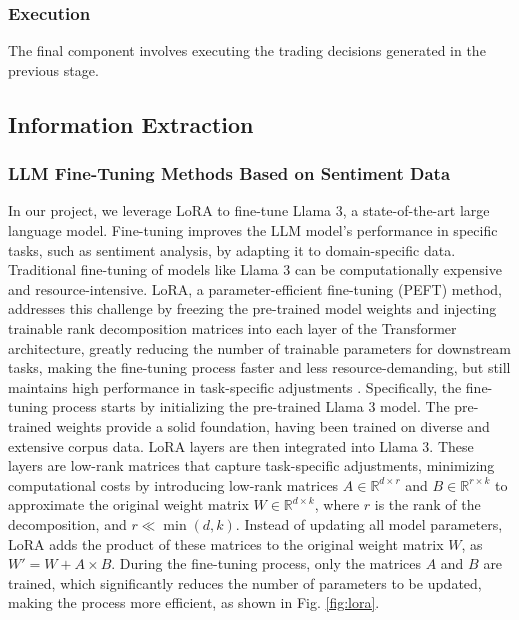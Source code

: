 \documentclass[conference]{IEEEtran}
\begin{document}
\subsubsection{Execution}

The final component involves executing the trading decisions generated in the previous stage.

\subsection{\textbf{Information Extraction}}

\subsubsection{\textbf{LLM Fine-Tuning Methods Based on Sentiment Data}}
In our project, we leverage LoRA to fine-tune Llama 3, a state-of-the-art large language model.
Fine-tuning improves the LLM model's performance in specific tasks, such as sentiment analysis, by adapting it to domain-specific data.
Traditional fine-tuning of models like Llama 3 can be computationally expensive and resource-intensive. 
LoRA, a parameter-efficient fine-tuning (PEFT) method, addresses this challenge by freezing the pre-trained model weights and injecting trainable rank decomposition matrices into each layer of the Transformer architecture, greatly reducing the number of trainable parameters for downstream tasks, making the fine-tuning process faster and less resource-demanding, but still maintains high performance in task-specific adjustments \cite{hu2021}.
Specifically, the fine-tuning process starts by initializing the pre-trained Llama 3 model. 
The pre-trained weights provide a solid foundation, having been trained on diverse and extensive corpus data. 
LoRA layers are then integrated into Llama 3. 
These layers are low-rank matrices that capture task-specific adjustments, minimizing computational costs by introducing low-rank matrices \( A \in \mathbb{R}^{d \times r} \) and \( B \in \mathbb{R}^{r \times k} \) to approximate the original weight matrix \( W \in \mathbb{R}^{d \times k} \), where \( r \) is the rank of the decomposition, and \( r \ll \min(d, k) \).
Instead of updating all model parameters, LoRA adds the product of these matrices to the original weight matrix \( W \), as \( W' = W + A \times B \). 
During the fine-tuning process, only the matrices \(A\) and \(B\) are trained, which significantly reduces the number of parameters to be updated, making the process more efficient, as shown in Fig. \ref{fig:lora}.
\end{document}
